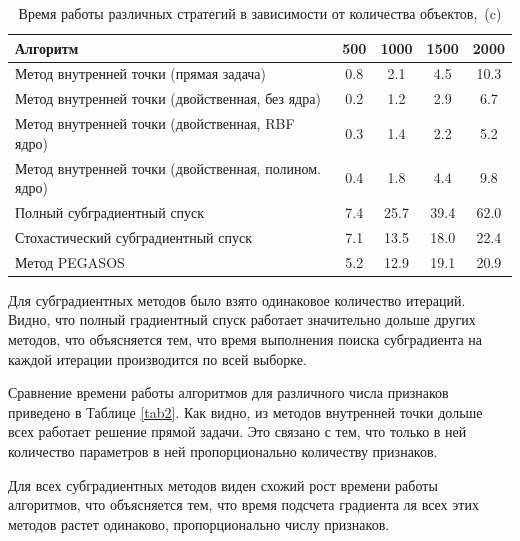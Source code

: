 \documentclass[12pt,fleqn,unicode]{article}
\begin{document}
\pagebreak
\begin{table}[h!]
	\centering
	\begin{tabular}{|l|c|c|c|c|}
\hline
Алгоритм & 500 & 1000 & 1500 & 2000 \\ \hline
Метод внутренней точки (прямая задача) & 0.8 & 2.1 & 4.5 & 10.3 \\ \hline
Метод внутренней точки (двойственная, без ядра) & 0.2 & 1.2 & 2.9 & 6.7 \\ \hline
Метод внутренней точки (двойственная, RBF ядро) & 0.3 & 1.4 & 2.2 & 5.2 \\ \hline
Метод внутренней точки (двойственная, полином. ядро) & 0.4 & 1.8 & 4.4 & 9.8 \\ \hline
Полный субградиентный спуск & 7.4 & 25.7 & 39.4 & 62.0 \\ \hline
Стохастический субградиентный спуск & 7.1 & 13.5 & 18.0 & 22.4 \\ \hline
Метод PEGASOS & 5.2 & 12.9 & 19.1 & 20.9 \\ \hline
	\end{tabular}
	\caption{Время работы различных стратегий в зависимости от количества объектов,~(c)}
	\label{tab1}
\end{table}

Для субградиентных методов было взято одинаковое количество итераций. 
Видно, что полный градиентный спуск работает значительно дольше других методов, 
что объясняется тем, что время выполнения поиска субградиента на каждой итерации производится по 
всей выборке.

Сравнение времени работы алгоритмов для различного числа признаков приведено в Таблице \ref{tab2}.
Как видно, из методов внутренней точки дольше всех работает решение прямой задачи. Это связано с тем,
что только в ней количество параметров в ней пропорционально количеству признаков.

Для всех субградиентных методов виден схожий рост времени работы алгоритмов, что объясняется тем, что
время подсчета градиента ля всех этих методов растет одинаково, пропорционально числу признаков.
\end{document}
